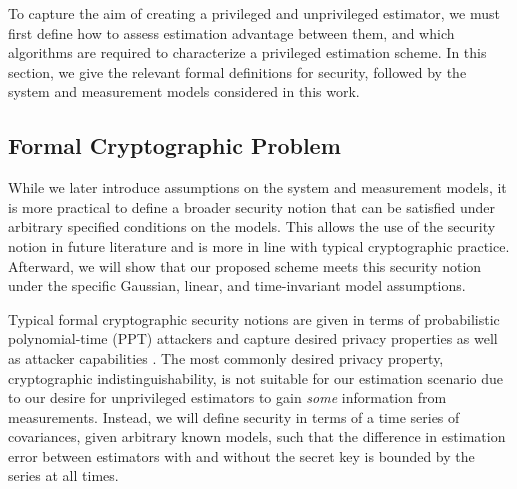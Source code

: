 \documentclass[letterpaper, 10 pt, conference]{ieeeconf}
\begin{document}
To capture the aim of creating a privileged and unprivileged estimator, we must first define how to assess estimation advantage between them, and which algorithms are required to characterize a privileged estimation scheme. In this section, we give the relevant formal definitions for security, followed by the system and measurement models considered in this work.

% 
% 

\subsection{Formal Cryptographic Problem}\label{subsec:crypto_problem}
While we later introduce assumptions on the system and measurement models, it is more practical to define a broader security notion that can be satisfied under arbitrary specified conditions on the models. This allows the use of the security notion in future literature and is more in line with typical cryptographic practice. Afterward, we will show that our proposed scheme meets this security notion under the specific Gaussian, linear, and time-invariant model assumptions.

Typical formal cryptographic security notions are given in terms of probabilistic polynomial-time (PPT) attackers and capture desired privacy properties as well as attacker capabilities \cite[Ch. 3]{katzIntroductionModernCryptography2008}. The most commonly desired privacy property, cryptographic indistinguishability, is not suitable for our estimation scenario due to our desire for unprivileged estimators to gain \textit{some} information from measurements. Instead, we will define security in terms of a time series of covariances, given arbitrary known models, such that the difference in estimation error between estimators with and without the secret key is bounded by the series at all times.
\end{document}
